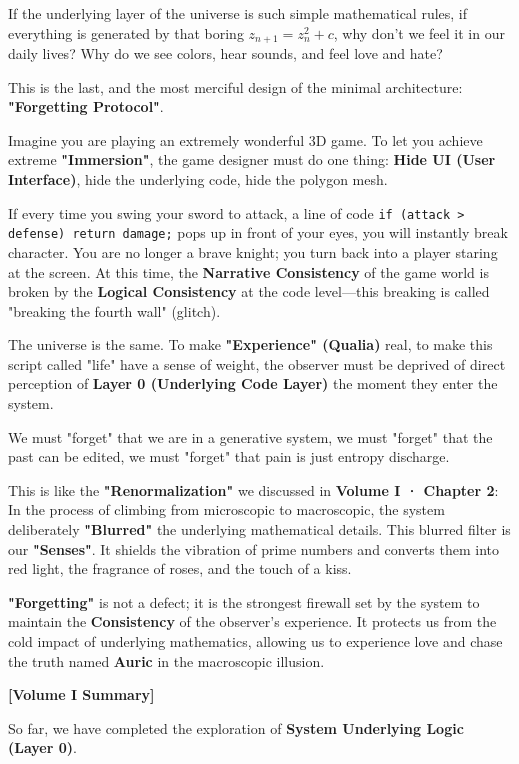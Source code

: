 If the underlying layer of the universe is such simple mathematical rules, if everything is generated by that boring $z_{n+1} = z_n^2 + c$, why don't we feel it in our daily lives? Why do we see colors, hear sounds, and feel love and hate?

This is the last, and the most merciful design of the minimal architecture: \textbf{"Forgetting Protocol"}.

Imagine you are playing an extremely wonderful 3D game. To let you achieve extreme \textbf{"Immersion"}, the game designer must do one thing: \textbf{Hide UI (User Interface)}, hide the underlying code, hide the polygon mesh.

If every time you swing your sword to attack, a line of code \texttt{if (attack > defense) return damage;} pops up in front of your eyes, you will instantly break character. You are no longer a brave knight; you turn back into a player staring at the screen. At this time, the \textbf{Narrative Consistency} of the game world is broken by the \textbf{Logical Consistency} at the code level—this breaking is called "breaking the fourth wall" (glitch).

The universe is the same. To make \textbf{"Experience" (Qualia)} real, to make this script called "life" have a sense of weight, the observer must be deprived of direct perception of \textbf{Layer 0 (Underlying Code Layer)} the moment they enter the system.

We must "forget" that we are in a generative system, we must "forget" that the past can be edited, we must "forget" that pain is just entropy discharge.

This is like the \textbf{"Renormalization"} we discussed in \textbf{Volume I · Chapter 2}: In the process of climbing from microscopic to macroscopic, the system deliberately \textbf{"Blurred"} the underlying mathematical details. This blurred filter is our \textbf{"Senses"}. It shields the vibration of prime numbers and converts them into red light, the fragrance of roses, and the touch of a kiss.

\textbf{"Forgetting"} is not a defect; it is the strongest firewall set by the system to maintain the \textbf{Consistency} of the observer's experience. It protects us from the cold impact of underlying mathematics, allowing us to experience love and chase the truth named \textbf{Auric} in the macroscopic illusion.

\textbf{[Volume I Summary]}

So far, we have completed the exploration of \textbf{System Underlying Logic (Layer 0)}.

